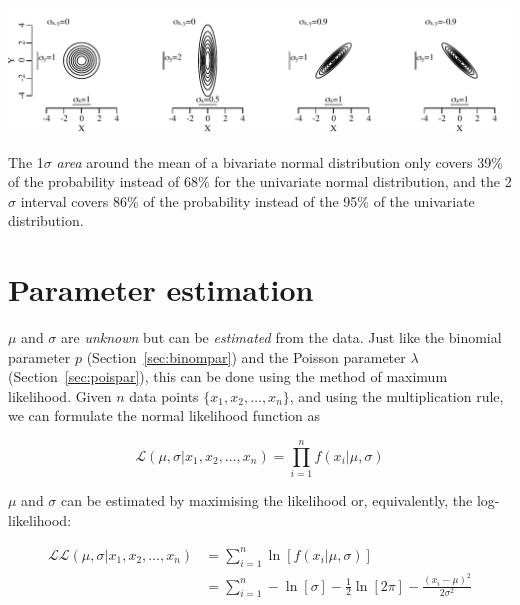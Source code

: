 \noindent\includegraphics[width=\textwidth]{../figures/cov.pdf}
\begingroup {}
\label{fig:cov}
\endgroup

The 1$\sigma$ \emph{area} around the mean of a bivariate normal
distribution only covers 39\% of the probability instead of $68\%$ for
the univariate normal distribution, and the 2$\sigma$ interval covers
86\% of the probability instead of the 95\% of the univariate
distribution.

\section{Parameter estimation}
\label{sec:normalparameters}

$\mu$ and $\sigma$ are \emph{unknown} but can be \emph{estimated} from
the data. Just like the binomial parameter $p$
(Section~\ref{sec:binompar}) and the Poisson parameter $\lambda$
(Section~\ref{sec:poispar}), this can be done using the method of
maximum likelihood.  Given $n$ data points $\{x_1, x_2, \ldots,
x_n\}$, and using the multiplication rule, we can formulate the normal
likelihood function as

\begin{equation}
  \mathcal{L}(\mu,\sigma|x_1,x_2,\ldots,x_n) =
  \prod\limits_{i=1}^{n}f(x_i|\mu,\sigma)
  \label{eq:Lnorm}
\end{equation}

$\mu$ and $\sigma$ can be estimated by maximising the likelihood or,
equivalently, the log-likelihood:

\begin{equation}
  \begin{split}
    \mathcal{LL}(\mu,\sigma|x_1,x_2,\ldots,x_n) & =
    \sum\limits_{i=1}^{n}\ln\left[f(x_i|\mu,\sigma)\right] \\ & =
    \sum\limits_{i=1}^{n} -\ln[\sigma] - \frac{1}{2}\ln[2\pi] -
    \frac{(x_i-\mu)^2}{2\sigma^2}
  \end{split}
  \label{eq:LLnorm}
\end{equation}

